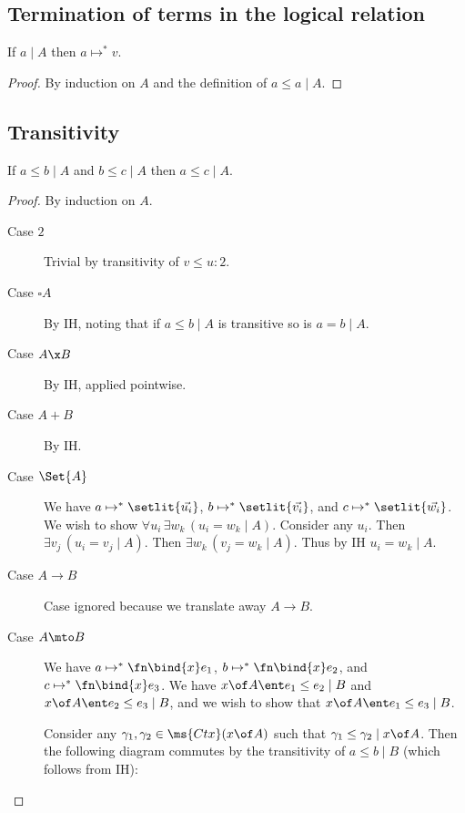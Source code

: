 \documentclass{article}
\newcommand{\step}{\mapsto}
\newcommand{\steps}{\step^*}
\newcommand{\lr}[2]{#2\mathrel{|}#1}
\newcommand{\lrcx}[3]{#1 \ent \lr{#2}{#3}}
\newcommand{\disc}[1]{\square{#1}}
\begin{document}

\subsection{Termination of terms in the logical relation}

\begin{theorem}
  If $\lr{A}{a}$ then $a \steps v$.
\end{theorem}

\begin{proof}
  By induction on $A$ and the definition of $\lr{A}{a \le a}$.
\end{proof}


\subsection{Transitivity}
\begin{theorem}[Transitivity]
  If $\lr{A}{a \le b}$ and $\lr{A}{b \le c}$ then $\lr{A}{a \le c}$.
\end{theorem}

\begin{proof}
  By induction on $A$.
  \begin{description}
    \item[Case $2$] Trivial by transitivity of $v \le u : 2$.
    \item[Case $\disc A$] By IH, noting that if $\lr{A}{a \le b}$ is transitive
      so is $\lr{A}{a = b}$.
    \item[Case $A \x B$] By IH, applied pointwise. 
    \item[Case $A + B$] By IH. 
    \item[Case $\Set{A}$] We have $a \steps \setlit{\vec{u_i}}$, $b \steps
      \setlit{\vec{v_i}}$, and $c \steps \setlit{\vec{w_i}}$. We wish to show
      $\forall u_i\, \exists w_k\, (\lr{A}{u_i = w_k})$. Consider any $u_i$.
      Then $\exists v_j\, (\lr{A}{u_i = v_j})$. Then $\exists w_k\, (\lr{A}{v_j
        = w_k})$. Thus by IH $\lr{A}{u_i = w_k}$.
    \item[Case $A \to B$] Case ignored because we translate away $A \to B$.
    \item[Case $A \mto B$] We have $a \steps \fn\bind{x}e_1$, $b \steps
      \fn\bind{x}e_2$, and $c \steps \fn\bind{x}e_3$. We have $\lrcx{x \of
        A}{B}{e_1 \le e_2}$ and $\lrcx{x \of A}{B}{e_2 \le e_3}$, and we wish to
      show that $\lrcx{x\of A}{B}{e_1 \le e_3}$.

      Consider any $\gamma_1, \gamma_2 \in \ms{Ctx}(x \of A)$ such that $\lr{x
        \of A}{\gamma_1 \le \gamma_2}$. Then the following diagram commutes by
      the transitivity of $\lr{B}{a \le b}$ (which follows from IH):
  \end{description}
\end{proof}
\end{document}
